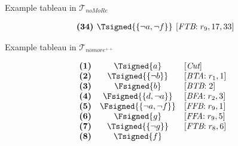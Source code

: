 \begin{frame}{Example tableau in $\mathcal{T}_{\textit{noMoRe}}$}
\begin{center}
\begin{minipage}[t]{16cm}
\begin{minipage}[t]{6cm}
\begin{minipage}[t]{2cm}
\[\begin{array}{l@{~~}c@{~~}l}
\textbf{(34)}                                      & \hspace{-0.1cm}
  \Tsigned{\{\neg a,\neg f\}}      \hspace{-0.1cm} &
  [\textit{FTB}{:}\;r_9, \text{17}, \text{33}]
\end{array}
\]
\end{minipage}
\end{minipage}
\end{minipage}
\end{center}
\end{frame}
\begin{frame}{Example tableau in $\mathcal{T}_{\textit{nomore}^{++}}$}
\TableauExampleProgram
\begin{center}
\begin{minipage}[t]{16cm}
\tiny
\begin{minipage}[t]{4.5cm}
\[
\hspace{-0.2cm}
\begin{array}{lcl}
\textbf{(1)}                                       &
  \Tsigned{a}                                      &
  [\textit{Cut}]                                   \\
\textbf{(2)}                                       &
  \Tsigned{\{\neg b\}}                     &
  [\textit{BTA}{:}\; r_1, \text{1}]                \\
\textbf{(3)}                                       &
  \Fsigned{b}                                      &
  [\textit{BTB}{:}\; \text{2}]                     \\
\textbf{(4)}                                       &
  \Fsigned{\{d,\neg a\}}                   &
  [\textit{BFA}{:}\;r_2, \text{3}]                 \\
\textbf{(5)}                                       &
  \Fsigned{\{\neg a,\neg f\}}      &
  [\textit{FFB}{:}\;r_9, \text{1}]                 \\
\textbf{(6)}                                       &
  \Fsigned{g}                                      &
  [\textit{FFA}{:}\;r_9, \text{5}]                 \\
\textbf{(7)}                                       &
  \Tsigned{\{\neg g\}}                     &
  [\textit{FTB}{:}\;r_8, \text{6}]                 \\
\textbf{(8)}                                       &
  \Tsigned{f}                                      &

\end{array}\]
\end{minipage}
\end{minipage}
\end{center}
\end{frame}
